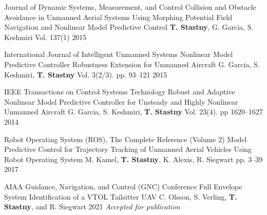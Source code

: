 \begin{cventries}
\cvpubentry
	{Journal of Dynamic Systems, Measurement, and Control} %
	{Collision and Obstacle Avoidance in Unmanned Aerial Systems Using Morphing Potential Field Navigation and Nonlinear Model Predictive Control} %
	{\textbf{T. Stastny}, G. Garcia, S. Keshmiri} %
	{Vol. 137(1)} %
	{2015} %
	{} %
	{} %
	
\cvpubentry
	{International Journal of Intelligent Unmanned Systems} %
	{Nonlinear Model Predictive Controller Robustness Extension for Unmanned Aircraft} %
	{G. Garcia, S. Keshmiri, \textbf{T. Stastny}} %
	{Vol. 3(2/3). pp. 93--121} %
	{2015} %
	{} %
	{} %

\cvpubentry
	{IEEE Transactions on Control Systems Technology} %
	{Robust and Adaptive Nonlinear Model Predictive Controller for Unsteady and Highly Nonlinear Unmanned Aircraft} %
	{G. Garcia, S. Keshmiri, \textbf{T. Stastny}} %
	{Vol. 23(4). pp 1620--1627} %
	{2014} %
	{} %
	{} %


\begin{flushleft}
\end{flushleft}

\cvpubentry
	{Robot Operating System (ROS), The Complete Reference (Volume 2)} %
	{Model Predictive Control for Trajectory Tracking of Unmanned Aerial Vehicles Using Robot Operating System} %
	{M. Kamel, \textbf{T. Stastny}, K. Alexis, R. Siegwart} %
	{pp. 3--39} %
	{2017} %
	{} %
	{} %


\begin{flushleft}
\end{flushleft}

\cvpubentry
	{AIAA Guidance, Navigation, and Control (GNC) Conference} %
	{Full Envelope System Identification of a VTOL Tailsitter UAV} %
	{C. Olsson, S. Verling, \textbf{T. Stastny}, and R. Siegwart} %
	{} %
	{2021} %
	{} %
	{\textit{Accepted for publication}} %


\end{cventries}
